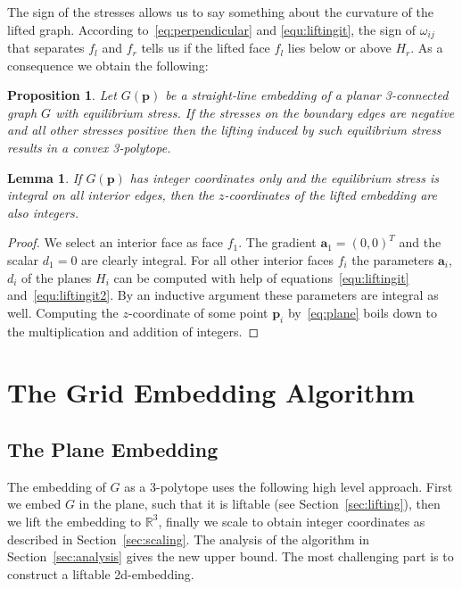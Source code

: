 \documentclass{article}
\theoremstyle{plain} \newtheorem{thm}{Theorem}[section]
\newtheorem{lem}{Lemma}[section]
\newtheorem{prop}{Proposition}
\newcommand{\p}{\mathbf{p}}
\newcommand{\R}{\mathbb{R}}
\begin{document}
The sign of the stresses allows us to say something about the curvature of the lifted graph. 
According to~\eqref{eq:perpendicular} and \eqref{equ:liftingit}, the sign of $\omega_{ij}$ that separates $f_{l}$ and $f_{r}$ tells us if the lifted face $f_{l}$ lies below or above $H_{r}$.
As a consequence we obtain the following:
\begin{prop}\label{obs:signstress}
Let $G(\mathbf{p})$ be a straight-line embedding of a planar 3-connected graph
 $G$ with equilibrium stress. 
If the stresses on the boundary edges are
negative and all other stresses positive then the
lifting induced by
such equilibrium stress results in a convex 3-polytope. 
\end{prop}

\begin{lem}\label{lem:scaling1}
If $G(\p)$ has integer coordinates only and the equilibrium stress is integral on all interior edges, then the $z$-coordinates
of the lifted embedding are also integers.
\end{lem}
\begin{proof}
We select an interior face as face $f_{1}$.
The gradient $\mathbf{a}_1=(0,0)^T$ and
the scalar $d_1=0$ are clearly integral. 
For all other interior faces $f_{i}$ the parameters $\mathbf{a}_i$, $d_i$ 
of the planes $H_i$ can be computed with
help of equations~\eqref{equ:liftingit} and~\eqref{equ:liftingit2}. 
By an inductive argument 
these parameters are integral as well. 
Computing the $z$-coordinate of some point $\p_{i}$
by~\eqref{eq:plane}
boils down to the multiplication and addition of integers.
\end{proof}

\section{The Grid Embedding Algorithm}
\label{sec:embedding}
\subsection{The Plane Embedding}

The embedding of $G$ as a 3-polytope uses the following high level approach.
First we embed $G$ in the plane, such that it is liftable (see Section~\ref{sec:lifting}), then we lift the embedding to $\R^3$, finally we scale to obtain integer coordinates as described in Section~\ref{sec:scaling}. The analysis of the algorithm in Section~\ref{sec:analysis} gives the new upper bound. The most challenging part is to construct a liftable 2d-embedding. 
\end{document}
